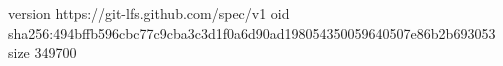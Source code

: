 version https://git-lfs.github.com/spec/v1
oid sha256:494bffb596cbc77c9cba3c3d1f0a6d90ad198054350059640507e86b2b693053
size 349700
